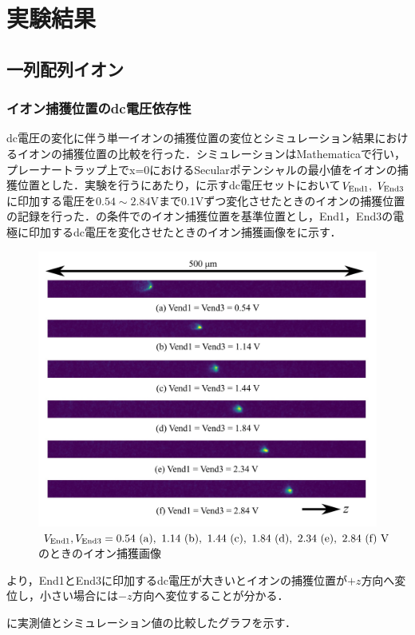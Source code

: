 \chapter{実験結果}
\section{一列配列イオン}
\subsection{イオン捕獲位置のdc電圧依存性}
dc電圧の変化に伴う単一イオンの捕獲位置の変位とシミュレーション結果におけるイオンの捕獲位置の比較を行った．シミュレーションはMathematicaで行い，プレーナートラップ上でx=0におけるSecularポテンシャルの最小値をイオンの捕獲位置とした．実験を行うにあたり，に示すdc電圧セットにおいて$V_{\rm End1}, \ V_{\rm End3}$に印加する電圧を$0.54 \sim 2.84$Vまで0.1Vずつ変化させたときのイオンの捕獲位置の記録を行った．の条件でのイオン捕獲位置を基準位置とし，End1，End3の電極に印加するdc電圧を変化させたときのイオン捕獲画像をに示す．
\begin{figure}[h]
	\begin{center}
		\includegraphics[width = 0.6 \linewidth]{./results/figure/displacement_End_Odd.png}
		\caption{$V_{\rm End1}, V_{\rm End3} = 0.54{\rm \ (a)}, \ 1.14{\rm \ (b)}, \ 1.44{\rm \ (c)}, \ 1.84{\rm \ (d)}, \ 2.34{\rm \ (e)}, \ 2.84{\rm \ (f)} \ {\rm V}$のときのイオン捕獲画像}
		\label{fig:displacement_End13}
	\end{center}
\end{figure}

より，End1とEnd3に印加するdc電圧が大きいとイオンの捕獲位置が$+z$方向へ変位し，小さい場合には$-z$方向へ変位することが分かる．

\clearpage

に実測値とシミュレーション値の比較したグラフを示す．

